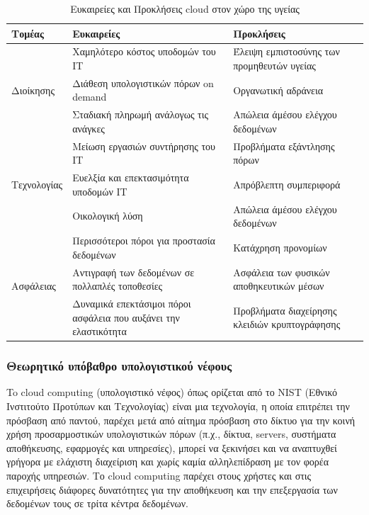 \begin{table}[h]
	\begin{center}
	    \begin{tabular}{|l| p{} | p{} |}
	    \hline
	    \rowcolor{grayy}
	    \textbf{Τομέας} & \textbf{Ευκαιρείες} & \textbf{Προκλήσεις}
	    \\ \hline    
	    \multirow{3}{*}{Διοίκησης} & Χαμηλότερο κόστος υποδομών του IT & Έλειψη εμπιστοσύνης των προμηθευτών υγείας \\
	    & Διάθεση υπολογιστικών πόρων on demand & Οργανωτική αδράνεια \\
	    & Σταδιακή πληρωμή ανάλογως τις ανάγκες & Απώλεια άμέσου ελέγχου δεδομένων \\ \hline
	    \multirow{3}{*}{Τεχνολογίας} & Μείωση εργασιών συντήρησης του ΙΤ & Προβλήματα εξάντλησης πόρων \\
	    & Ευελξία και επεκτασιμότητα υποδομών IT & Απρόβλεπτη συμπεριφορά \\
	    & Οικολογική λύση & Απώλεια άμέσου ελέγχου δεδομένων  \\ \hline
	    \multirow{3}{*}{Ασφάλειας} & Περισσότεροι πόροι για προστασία δεδομένων & Κατάχρηση προνομίων \\
	    & Αντιγραφή των δεδομένων σε πολλαπλές τοποθεσίες & Ασφάλεια των φυσικών αποθηκευτικών μέσων \\
	    & Δυναμικά επεκτάσιμοι πόροι ασφάλεια που αυξάνει την ελαστικότητα & Προβλήματα διαχείρησης κλειδιών κρυπτογράφησης \\ \hline
	    \end{tabular}
	    \caption{Ευκαιρείες και Προκλήσεις cloud στον χώρο της υγείας}
	    \label{tab:health_cloud_challenges_opportunities}
	\end{center}
\end{table}	
	\subsubsection{Θεωρητικό υπόβαθρο υπολογιστικού νέφους}
	To cloud computing (υπολογιστικό νέφος) όπως ορίζεται από το NIST (Εθνικό Ινστιτούτο Προτύπων και Τεχνολογίας)  είναι μια τεχνολογία, η οποία επιτρέπει την πρόσβαση από παντού, παρέχει μετά από αίτημα πρόσβαση στο δίκτυο για την κοινή χρήση προσαρμοστικών υπολογιστικών πόρων (π.χ., δίκτυα, servers, συστήματα αποθήκευσης, εφαρμογές και υπηρεσίες), μπορεί να ξεκινήσει και να αναπτυχθεί γρήγορα με ελάχιστη διαχείριση και χωρίς καμία αλληλεπίδραση με τον φορέα παροχής υπηρεσιών. \cite{cloudComputing} Το cloud computing παρέχει στους χρήστες και στις επιχειρήσεις διάφορες δυνατότητες για την αποθήκευση και την επεξεργασία των δεδομένων τους σε τρίτα κέντρα δεδομένων. \cite{Haghighat2015}
	
